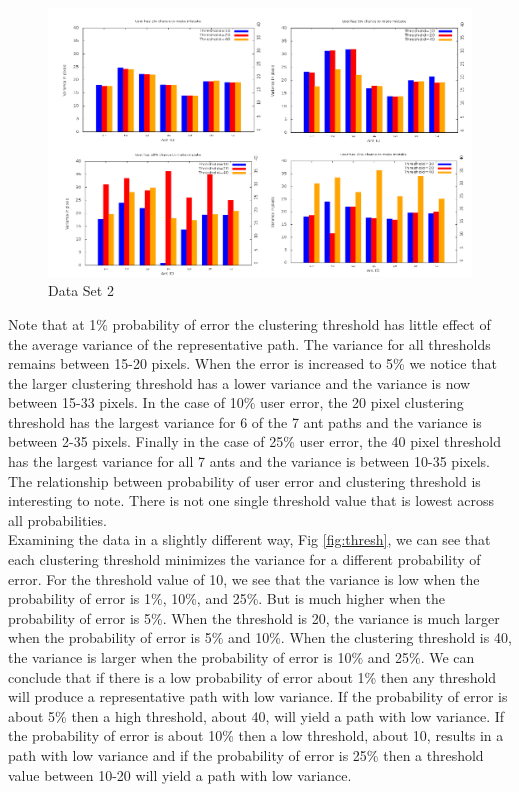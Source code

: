 \documentclass[12pt]{article}
\begin{document}
\begin{figure}[h!]
\centering
\includegraphics[width=6in]{GDataPlot8.png}
\caption{Data Set 2}
\label{fig:prob}
\end{figure}

Note that at 1\% probability of error the clustering threshold has little effect of the average variance of the representative path. The variance for all thresholds remains between 15-20 pixels. When the error is increased to 5\% we notice that the larger clustering threshold has a lower variance and the variance is now between 15-33 pixels. In the case of 10\% user error, the 20 pixel clustering threshold has the largest variance for 6 of the 7 ant paths and the variance is between 2-35 pixels. Finally in the case of 25\% user error, the 40 pixel threshold has the largest variance for all 7 ants and the variance is between 10-35 pixels. The relationship between probability of user error and clustering threshold is interesting to note. There is not one single threshold value that is lowest across all probabilities.\\
Examining the data in a slightly different way, Fig \ref{fig:thresh}, we can see that each clustering threshold minimizes the variance for a different probability of error. For the threshold value of 10, we see that the variance is low when the probability of error is 1\%, 10\%, and 25\%. But is much higher when the probability of error is 5\%. When the threshold is 20, the variance is much larger when the probability of error is 5\% and 10\%. When the clustering threshold is 40, the variance is larger when the probability of error is 10\% and 25\%. We can conclude that if there is a low probability of error  about 1\% then any threshold will produce a representative path with low variance. If the probability of error is about 5\%  then a high threshold, about 40, will yield a path with low variance. If the probability of error is about 10\% then a low threshold, about 10, results in a path with low variance and if the probability of error is 25\% then a threshold value between 10-20 will yield a path with low variance.  
\end{document}
